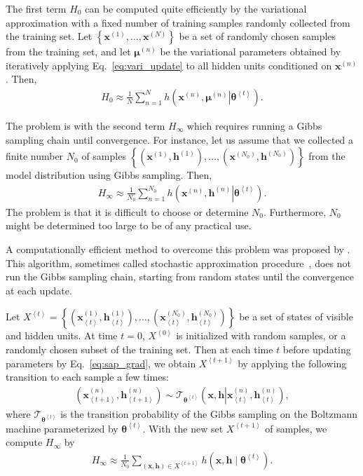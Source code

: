 \documentclass{now}
\newcommand{\qt}[1]{\left<#1\right>}
\newcommand{\vect}[1]{\mathbf{#1}}
\newcommand{\vects}[1]{\boldsymbol{#1}}
\newcommand{\vh}[0]{\vect{h}}
\newcommand{\vx}[0]{\vect{x}}
\newcommand{\vmu}[0]{\vects{\mu}}
\newcommand{\TT}[0]{{\vects{\theta}}}
\newcommand{\T}[0]{\mathcal{T}}
\begin{document}
The first term $H_0$ can be computed quite efficiently by the variational
approximation with a fixed number of training samples randomly collected from
the training set.  Let $\left\{ \vx^{(1)}, \dots, \vx^{(N)} \right\}$ be a set
of randomly chosen samples from the training set, and let $\vmu^{(n)}$ be the
variational parameters obtained by iteratively applying
Eq.~\eqref{eq:vari_update} to all hidden units conditioned on $\vx^{(n)}$. Then, 
\begin{align*}
    H_0 \approx \frac{1}{N}\sum_{n=1}^{N} h\left(\left.\vx^{(n)}, \vmu^{(n)}
    \right| \TT^{\qt{t}}\right).
\end{align*}

The problem is with the second term $H_\infty$ which requires running a Gibbs
sampling chain until convergence. For instance, let us assume that we collected
a finite number $N_0$ of samples $\left\{ (\vx^{(1)}, \vh^{(1)}), \dots,
(\vx^{(N_0)}, \vh^{(N_0)}) \right\}$ from the model distribution using Gibbs
sampling. Then, 
\begin{align*}
    H_\infty \approx \frac{1}{N_0} \sum_{n=1}^{N_0}
    h\left(\left.\vx^{(n)}, \vh^{(n)} \right| \TT^{\qt{t}}\right).
\end{align*}
The problem is that it is difficult to choose or determine $N_0$.  Furthermore,
$N_0$ might be determined too large to be of any practical use.

A computationally efficient method to overcome this problem was proposed by
\citet{Younes1988}. This algorithm, sometimes called stochastic approximation
procedure~\citep{Salakhutdinov2009}, does not run the Gibbs sampling chain,
starting from random states until the convergence at each update.

Let $X^{\qt{t}} = \left\{ \left(\vx_{\qt{t}}^{(1)}, \vh_{\qt{t}}^{(1)}\right),
\dots, \left(\vx_{\qt{t}}^{(N_0)}, \vh_{\qt{t}}^{(N_0)}\right)\right\}$ be a set
of states of visible and hidden units. At time $t=0$, $X^{\qt{0}}$ is
initialized with random samples, or a randomly chosen subset of the training
set. Then at each time $t$ before updating parameters by
Eq.~\eqref{eq:sap_grad}, we obtain $X^{\qt{t+1}}$ by applying the following
transition to each sample a few times:
\begin{align*}
    \left( \vx_{\qt{t+1}}^{(n)}, \vh_{\qt{t+1}}^{(n)}\right) \sim
    \T_{\TT^{\qt{t}}} \left(\vx, \vh \left| \vx_{\qt{t}}^{(n)},
    \vh_{\qt{t}}^{(n)}\right.\right),
\end{align*}
where $\T_{\TT^{\qt{t}}}$ is the transition probability of the Gibbs sampling on
the Boltzmann machine parameterized by $\TT^{\qt{t}}$. With the new set
$X^{\qt{t+1}}$ of samples, we compute $H_\infty$ by
\begin{align*}
    H_\infty \approx \frac{1}{N_0} \sum_{(\vx, \vh) \in
    X^{\qt{t+1}}}
    h\left(\vx, \vh \mid \TT^{\qt{t}}\right).
\end{align*}
\end{document}
